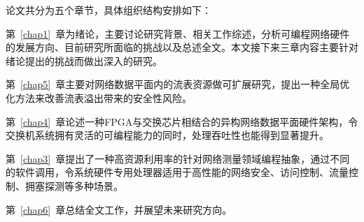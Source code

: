 \label{chap15}

论文共分为五个章节，具体组织结构安排如下：

第~\ref{chap1}~章为绪论，主要讨论研究背景、相关工作综述，分析可编程网络硬件的发展方向、目前研究所面临的挑战以及总述全文。本文接下来三章内容主要针对绪论提出的挑战而做出深入的研究。

第~\ref{chap5}~章主要对网络数据平面内的流表资源做可扩展研究，提出一种全局优化方法来改善流表溢出带来的安全性风险。

第~\ref{chap4}~章论述一种FPGA与交换芯片相结合的异构网络数据平面硬件架构，令交换机系统拥有灵活的可编程能力的同时，处理吞吐性也能得到显著提升。

第~\ref{chap3}~章提出了一种高资源利用率的针对网络测量领域编程抽象，通过不同的软件调用，令系统硬件专用处理器适用于高性能的网络安全、访问控制、流量控制、拥塞探测等多种场景。

第~\ref{chap6}~章总结全文工作，并展望未来研究方向。




































